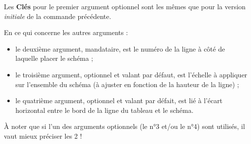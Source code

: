 \documentclass{article}
\newcommand\Cle[1]{{\bfseries\sffamily\textlangle #1\textrangle}}
\begin{document}
\begin{codetex}
\end{codetex}

\begin{codecles}
Les \Cle{Clés} pour le premier argument optionnel sont les mêmes que pour la version \textit{initiale} de la commande précédente.

En ce qui concerne les autres arguments :

\begin{itemize}
	\item le deuxième argument, mandataire, est le numéro de la ligne à côté de laquelle placer le schéma ;
	\item le troisième argument, optionnel et valant \Cle{0.85} par défaut, est l'échelle à appliquer sur l'ensemble du schéma (à ajuster en fonction de la hauteur de la ligne) ;
	\item le quatrième argument, optionnel et valant \Cle{1.5} par défait, est lié à l'écart horizontal entre le bord de la ligne du tableau et le schéma.
\end{itemize}

À noter que si l'un des arguments optionnels (le n°3 et/ou le n°4) sont utilisés, il vaut mieux préciser les 2 !
\end{codecles}


\begin{codetex}
\begin{center}
\end{center}
\end{codetex}

\begin{codesortie}
\begin{center}
\end{center}
\end{codesortie}
\end{document}

